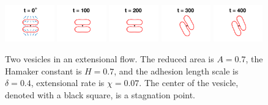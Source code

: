 \documentclass[prf,superscriptaddress,showpacs]{revtex4-1}
\begin{document}
\begin{figure}[htp]
  \includegraphics[width = 0.19\textwidth,trim={5cm 2cm 5cm 1cm},clip]{figs/extensional_adR4em1adS7em1Chi7em2_ra070_image01.png}
  \includegraphics[width = 0.19\textwidth,trim={5cm 2cm 5cm 1cm},clip]{figs/extensional_adR4em1adS7em1Chi7em2_ra070_image02.png}
  \includegraphics[width = 0.19\textwidth,trim={5cm 2cm 5cm 1cm},clip]{figs/extensional_adR4em1adS7em1Chi7em2_ra070_image03.png}
  \includegraphics[width = 0.19\textwidth,trim={5cm 2cm 5cm 1cm},clip]{figs/extensional_adR4em1adS7em1Chi7em2_ra070_image04.png}
  \includegraphics[width = 0.19\textwidth,trim={5cm 2cm 5cm 1cm},clip]{figs/extensional_adR4em1adS7em1Chi7em2_ra070_image05.png}
  \caption{\label{fig:extensional2} Two vesicles in an extensional flow.
  The reduced area is $A = 0.7$, the Hamaker constant is $H = 0.7$, and
  the adhesion length scale is $\delta = 0.4$, extensional rate is $\chi
  = 0.07$.  The center of the vesicle, denoted with a black square, is a
  stagnation point.}
\end{figure}
\end{document}
